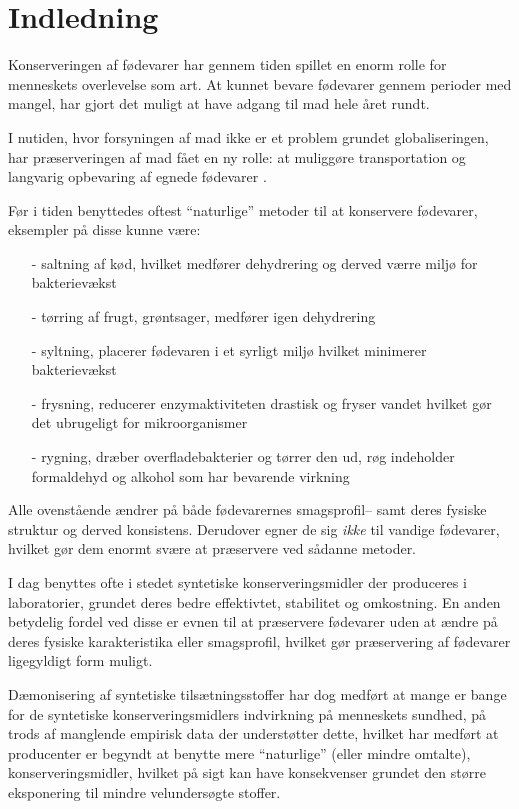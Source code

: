 \section{Indledning}
    Konserveringen af fødevarer har gennem tiden spillet en enorm rolle for menneskets overlevelse som art. At kunnet bevare fødevarer gennem perioder med mangel, har gjort det muligt at have adgang til mad hele året rundt. 

    I nutiden, hvor forsyningen af mad ikke er et problem grundet globaliseringen, har præserveringen af mad fået en ny rolle: at muliggøre transportation og langvarig opbevaring af egnede fødevarer \parencite{Elis2019}.

    Før i tiden benyttedes oftest ``naturlige'' metoder til at konservere fødevarer, eksempler på disse kunne være: 
    \begin{itemize}
        \item[-] saltning af kød, hvilket medfører dehydrering og derved værre miljø for bakterievækst
        \item[-] tørring af frugt, grøntsager, medfører igen dehydrering
        \item[-] syltning, placerer fødevaren i et syrligt miljø hvilket minimerer bakterievækst
        \item[-] frysning, reducerer enzymaktiviteten drastisk og fryser vandet hvilket gør det ubrugeligt for mikroorganismer
        \item[-] rygning, dræber overfladebakterier og tørrer den ud, røg indeholder formaldehyd og alkohol som har bevarende virkning
    \end{itemize}
    Alle ovenstående ændrer på både fødevarernes smagsprofil-- samt deres fysiske struktur og derved konsistens. Derudover egner de sig \textit{ikke} til vandige fødevarer, hvilket gør dem enormt svære at præservere ved sådanne metoder. 

    I dag benyttes ofte i stedet syntetiske konserveringsmidler der produceres i laboratorier, grundet deres bedre effektivtet, stabilitet og omkostning. En anden betydelig fordel ved disse er evnen til at præservere fødevarer uden at ændre på deres fysiske karakteristika eller smagsprofil, hvilket gør præservering af fødevarer ligegyldigt form muligt.

    Dæmonisering af syntetiske tilsætningsstoffer har dog medført at mange er bange for de syntetiske konserveringsmidlers indvirkning på menneskets sundhed, på trods af manglende empirisk data der understøtter dette, hvilket har medført at producenter er begyndt at benytte mere ``naturlige'' (eller mindre omtalte), konserveringsmidler, hvilket på sigt kan have konsekvenser grundet den større eksponering til mindre velundersøgte stoffer.

